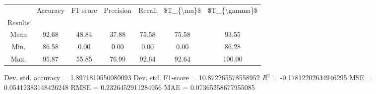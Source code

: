 \begin{tabular}{|c|c|c|c|c|c|c|}
\toprule
{} &  Accuracy &  F1 score &  Precision &  Recall &  \$T\_\{\textbackslash mu\}\$ &  \$T\_\{\textbackslash gamma\}\$ \\
Results &           &           &            &         &            &               \\
\hline
Mean    &     92.68 &     48.84 &      37.88 &   75.58 &      75.58 &         93.55 \\
Min.    &     86.58 &      0.00 &       0.00 &    0.00 &       0.00 &         86.28 \\
Max.    &     95.87 &     55.85 &      76.99 &   92.64 &      92.64 &        100.00 \\
\bottomrule
\end{tabular}

 Dev. std. accuracy = 1.8971810550080093
 Dev. std. F1-score = 10.872265578558952
 $R^2$ = -0.17812202634946295
 MSE = 0.05412383148426248
 RMSE = 0.2326452911284956
 MAE = 0.07365258677955085